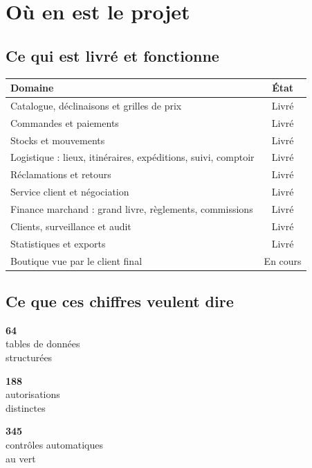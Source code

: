 \documentclass[11pt,a4paper]{article}
\newcommand{\chiffre}[2]{%
  \begin{minipage}[t]{0.30\textwidth}
    \centering
    {\Huge\bfseries\color{marque}#1}\\[0.3em]
    {\small\color{gris}#2}
  \end{minipage}%
}
\begin{document}
\newpage
\section{Où en est le projet}

\subsection{Ce qui est livré et fonctionne}

\begin{center}
\begin{tabularx}{\textwidth}{@{}>{\raggedright\arraybackslash}Xc@{}}
\toprule
\textbf{Domaine} & \textbf{État} \\
\midrule
Catalogue, déclinaisons et grilles de prix & Livré \\
Commandes et paiements & Livré \\
Stocks et mouvements & Livré \\
Logistique : lieux, itinéraires, expéditions, suivi, comptoir & Livré \\
Réclamations et retours & Livré \\
Service client et négociation & Livré \\
Finance marchand : grand livre, règlements, commissions & Livré \\
Clients, surveillance et audit & Livré \\
Statistiques et exports & Livré \\
\addlinespace
Boutique vue par le client final & En cours \\
\bottomrule
\end{tabularx}
\end{center}

\subsection{Ce que ces chiffres veulent dire}

\vspace{0.8em}
\noindent
\chiffre{64}{tables de données\\structurées}
\hfill
\chiffre{188}{autorisations\\distinctes}
\hfill
\chiffre{345}{contrôles automatiques\\au vert}
\vspace{1.2em}
\end{document}
